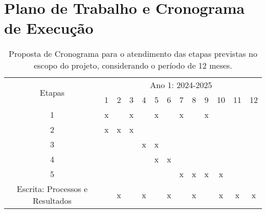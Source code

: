 \section{Plano de Trabalho e Cronograma de Execução}

\begin{table}[h]

\caption{Proposta de Cronograma para o atendimento das etapas previstas no escopo do projeto, considerando o período de 12 meses.}

\label{tab:cronograma}
	\centering
		\begin{tabular} {|c|c|c|c|c|c|c|c|c|c|c|c|c|}
		\hline
		\multirow{2}{*}{Etapas}
		&\multicolumn{12}{c|}{Ano 1: 2024-2025}\\ \cline{2-13}
		&1&2&3&4&5&6&7&8&9&10&11&12\\
		\hline
		1&x&&x&&x&&x&&x&&&\\
		\hline
		2&x&x&x&&&&&&&&&\\
		\hline	
		3&&&&x&x&&&&&&&\\
		\hline			
		4&&&&&x&x&&&&&&\\
		\hline	
		5&&&&&&&x&x&x&x&&\\
		\hline	
		

		Escrita: Processos e Resultados&&x&&x&&x&&x&&x&x&x\\
		\hline
		\end{tabular}
\end{table}
